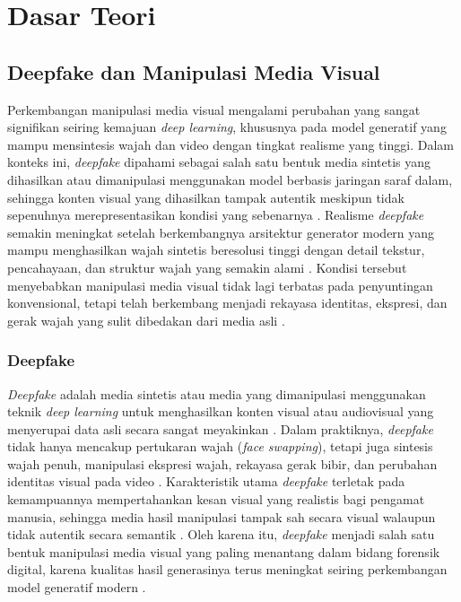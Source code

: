\section{Dasar Teori} \label{II.Teori}
\subsection{Deepfake dan Manipulasi Media Visual} \label{II.Teori1}
Perkembangan manipulasi media visual mengalami perubahan yang sangat signifikan seiring kemajuan \textit{deep learning}, khususnya pada model generatif yang mampu mensintesis wajah dan video dengan tingkat realisme yang tinggi. Dalam konteks ini, \textit{deepfake} dipahami sebagai salah satu bentuk media sintetis yang dihasilkan atau dimanipulasi menggunakan model berbasis jaringan saraf dalam, sehingga konten visual yang dihasilkan tampak autentik meskipun tidak sepenuhnya merepresentasikan kondisi yang sebenarnya \cite{Mirsky_2021}. Realisme \textit{deepfake} semakin meningkat setelah berkembangnya arsitektur generator modern yang mampu menghasilkan wajah sintetis beresolusi tinggi dengan detail tekstur, pencahayaan, dan struktur wajah yang semakin alami \cite{karras2019stylebasedgeneratorarchitecturegenerative}. Kondisi tersebut menyebabkan manipulasi media visual tidak lagi terbatas pada penyuntingan konvensional, tetapi telah berkembang menjadi rekayasa identitas, ekspresi, dan gerak wajah yang sulit dibedakan dari media asli \cite{Mirsky_2021,karras2019stylebasedgeneratorarchitecturegenerative}. \par

\subsubsection{Deepfake} \label{II.Teori1.1}
\textit{Deepfake} adalah media sintetis atau media yang dimanipulasi menggunakan teknik \textit{deep learning} untuk menghasilkan konten visual atau audiovisual yang menyerupai data asli secara sangat meyakinkan \cite{Mirsky_2021}. Dalam praktiknya, \textit{deepfake} tidak hanya mencakup pertukaran wajah (\textit{face swapping}), tetapi juga sintesis wajah penuh, manipulasi ekspresi wajah, rekayasa gerak bibir, dan perubahan identitas visual pada video \cite{Mirsky_2021}. Karakteristik utama \textit{deepfake} terletak pada kemampuannya mempertahankan kesan visual yang realistis bagi pengamat manusia, sehingga media hasil manipulasi tampak sah secara visual walaupun tidak autentik secara semantik \cite{Mirsky_2021}. Oleh karena itu, \textit{deepfake} menjadi salah satu bentuk manipulasi media visual yang paling menantang dalam bidang forensik digital, karena kualitas hasil generasinya terus meningkat seiring perkembangan model generatif modern \cite{Mirsky_2021,karras2019stylebasedgeneratorarchitecturegenerative}. \par

